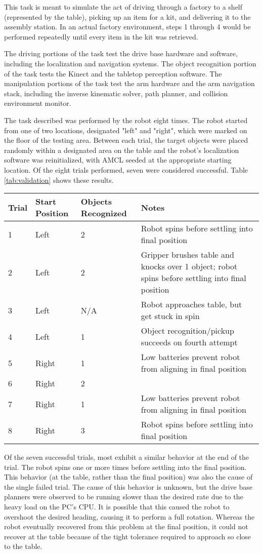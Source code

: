 \documentclass[]{cwru} %
\begin{document}
This task is meant to simulate the act of driving through a factory to a
shelf (represented by the table), picking up an item for a kit, and
delivering it to the assembly station. In an actual factory environment,
steps 1 through 4 would be performed repeatedly until every item in the
kit was retrieved.

The driving portions of the task test the drive base hardware and
software, including the localization and navigation systems. The object
recognition portion of the task tests the Kinect and the tabletop
perception software. The manipulation portions of the task test the arm
hardware and the arm navigation stack, including the inverse kinematic
solver, path planner, and collision environment monitor.

The task described was performed by the robot eight times. The robot
started from one of two locations, designated "left" and "right", which
were marked on the floor of the testing area. Between each trial, the
target objects were placed randomly within a designated area on the
table and the robot's localization software was reinitialized, with AMCL
seeded at the appropriate starting location. Of the eight trials
performed, seven were considered successful. Table \ref{tab:validation} shows these
results.

\begin{table}
\caption{Validation Task Results}
\label{tab:validation}

\begin{longtable}[c]{@{}lp{3cm}p{2.5cm}p{7.5cm}@{}}
\toprule
\textbf{Trial} & \textbf{Start
Position} & \textbf{Objects Recognized} & \textbf{Notes}\tabularnewline
\midrule
\endhead
1 & Left & 2 & Robot spins before settling into final
position\tabularnewline
2 & Left & 2 & Gripper brushes table and knocks over 1 object; robot
spins before settling into final position\tabularnewline
3 & Left & N/A & Robot approaches table, but get stuck in
spin\tabularnewline
4 & Left & 1 & Object recognition/pickup succeeds on fourth
attempt\tabularnewline
5 & Right & 1 & Low batteries prevent robot from aligning in final
position\tabularnewline
6 & Right & 2 &\tabularnewline
7 & Right & 1 & Low batteries prevent robot from aligning in final
position\tabularnewline
8 & Right & 3 & Robot spins before settling into final
position\tabularnewline
\bottomrule
\end{longtable}
\end{table}

Of the seven successful trials, most exhibit a similar behavior at the
end of the trial. The robot spins one or more times before settling into
the final position. This behavior (at the table, rather than the final
position) was also the cause of the single failed trial. The cause of
this behavior is unknown, but the drive base planners were observed to
be running slower than the desired rate due to the heavy load on the
PC's CPU. It is possible that this caused the robot to overshoot the
desired heading, causing it to perform a full rotation. Whereas the
robot eventually recovered from this problem at the final position, it
could not recover at the table because of the tight tolerance required
to approach so close to the table.
\end{document}
